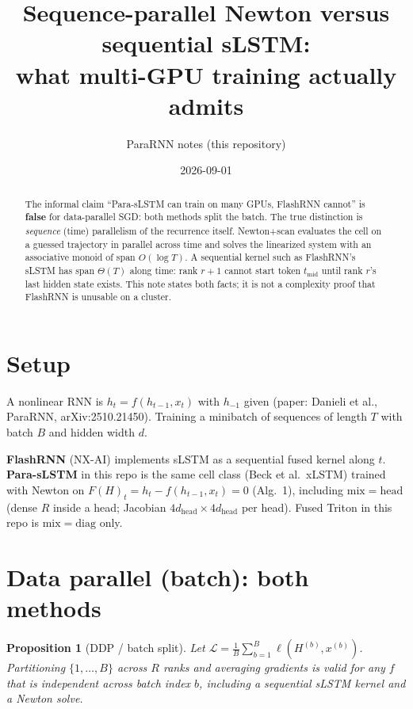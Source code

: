 \documentclass[11pt]{article}
\title{Sequence-parallel Newton versus sequential sLSTM:\\
what multi-GPU training actually admits}
\author{ParaRNN notes (this repository)}
\date{2026-09-01}
\theoremstyle{plain}
\newtheorem{proposition}{Proposition}
\begin{document}
\maketitle

\begin{abstract}
The informal claim ``Para-sLSTM can train on many GPUs, FlashRNN cannot'' is
\textbf{false} for data-parallel SGD: both methods split the batch. The true
distinction is \emph{sequence} (time) parallelism of the recurrence itself.
Newton+scan evaluates the cell on a guessed trajectory in parallel across
time and solves the linearized system with an associative monoid of span
$O(\log T)$. A sequential kernel such as FlashRNN's sLSTM has span $\Theta(T)$
along time: rank $r{+}1$ cannot start token $t_{\mathrm{mid}}$ until rank $r$'s
last hidden state exists. This note states both facts; it is not a complexity
proof that FlashRNN is unusable on a cluster.
\end{abstract}

\section{Setup}

A nonlinear RNN is $h_t = f(h_{t-1}, x_t)$ with $h_{-1}$ given (paper:
Danieli et al., ParaRNN, arXiv:2510.21450). Training a minibatch of sequences
of length $T$ with batch $B$ and hidden width $d$.

\textbf{FlashRNN} (NX-AI) implements sLSTM as a sequential fused kernel along
$t$. \textbf{Para-sLSTM} in this repo is the same cell class (Beck et al.\
xLSTM) trained with Newton on $F(H)_t = h_t - f(h_{t-1}, x_t)=0$ (Alg.~1),
including $\mathrm{mix}=\mathrm{head}$ (dense $R$ inside a head; Jacobian
$4d_{\mathrm{head}}\times 4d_{\mathrm{head}}$ per head). Fused Triton in this
repo is $\mathrm{mix}=\mathrm{diag}$ only.

\section{Data parallel (batch): both methods}

\begin{proposition}[DDP / batch split]
\label{prop:ddp}
Let $\mathcal{L} = \frac{1}{B}\sum_{b=1}^{B} \ell(H^{(b)}, x^{(b)})$.
Partitioning $\{1,\ldots,B\}$ across $R$ ranks and averaging gradients is
valid for any $f$ that is independent across batch index $b$, including a
sequential sLSTM kernel and a Newton solve.
\end{proposition}
\end{document}
